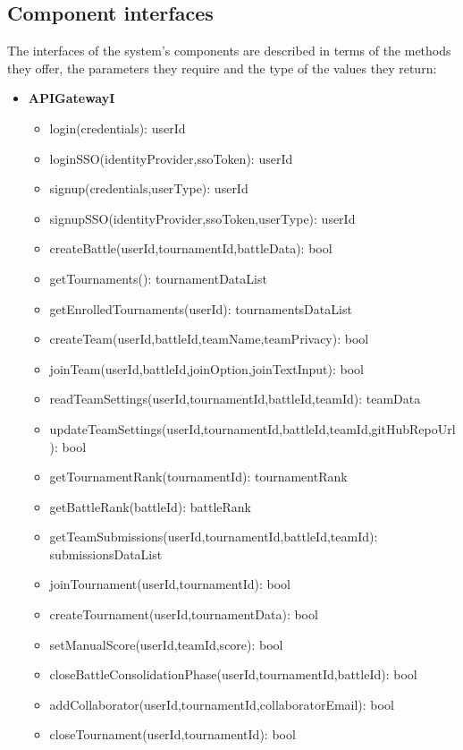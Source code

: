 \subsection{Component interfaces}
The interfaces of the system's components are described in terms of the methods they offer, the parameters they require and the type of the values they return:
\begin{itemize}
    \item \textbf{APIGatewayI}
    \begin{itemize}
        \item login(credentials): userId
        \item loginSSO(identityProvider,ssoToken): userId
        \item signup(credentials,userType): userId
        \item signupSSO(identityProvider,ssoToken,userType): userId
        \item createBattle(userId,tournamentId,battleData): bool
        \item getTournaments(): tournamentDataList
        \item getEnrolledTournaments(userId): tournamentsDataList
        \item createTeam(userId,battleId,teamName,teamPrivacy): bool
        \item joinTeam(userId,battleId,joinOption,joinTextInput): bool
        \item readTeamSettings(userId,tournamentId,battleId,teamId): teamData
        \item updateTeamSettings(userId,tournamentId,battleId,teamId,gitHubRepoUrl): bool
        \item getTournamentRank(tournamentId): tournamentRank
        \item getBattleRank(battleId): battleRank
        \item getTeamSubmissions(userId,tournamentId,battleId,teamId): submissionsDataList
        \item joinTournament(userId,tournamentId): bool
        \item createTournament(userId,tournamentData): bool
        \item setManualScore(userId,teamId,score): bool
        \item closeBattleConsolidationPhase(userId,tournamentId,battleId): bool
        \item addCollaborator(userId,tournamentId,collaboratorEmail): bool
        \item closeTournament(userId,tournamentId): bool

\end{itemize}
\end{itemize}
